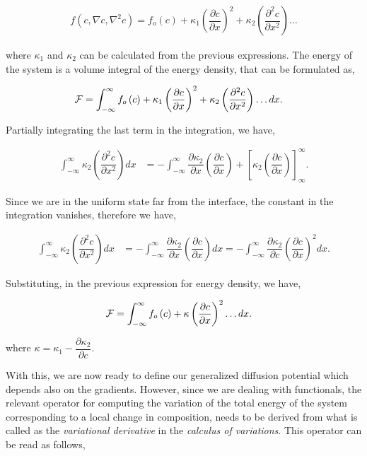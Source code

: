 \documentclass[english]{iambook}
\begin{document}
\begin{align}
 f\left(c, \nabla c, \nabla^{2}c\right) = f_o\left(c\right) + \kappa_1\left(\dfrac{\partial c}{\partial x}\right)^{2}
 + \kappa_2\left(\dfrac{\partial ^{2}c}{\partial x^{2}}\right)\ldots
\end{align}

where $\kappa_1$ and $\kappa_2$ can be calculated from the previous
expressions. The energy of the system is a volume integral of the energy
density, that can be formulated as, 

\begin{align}
 {\cal F} &= \int_{-\infty}^{\infty} f_o\left(c\right) +  \kappa_1\left(\dfrac{\partial c}{\partial x}\right)^{2}
 + \kappa_2\left(\dfrac{\partial ^{2}c}{\partial x^{2}}\right)\ldots dx.
 \label{energy_density}
\end{align}

Partially integrating the last term in the integration, we have,

\begin{align}
 \int_{-\infty}^{\infty}\kappa_2\left(\dfrac{\partial ^{2}c}{\partial x^{2}}\right)dx &=
 -\int_{-\infty}^{\infty}\dfrac{\partial \kappa_2}{\partial x}\left(\dfrac{\partial c}{\partial x}\right)
 +\left[\kappa_2\left(\dfrac{\partial c}{\partial x}\right)\right]_{\infty}^{\infty}.
\end{align}

Since we are in the uniform state far from the interface, the constant
in the integration vanishes, therefore we have,

\begin{align}
 \int_{-\infty}^{\infty}\kappa_2\left(\dfrac{\partial ^{2}c}{\partial x^{2}}\right)dx &=
 -\int_{-\infty}^{\infty}\dfrac{\partial \kappa_2}{\partial x}\left(\dfrac{\partial c}{\partial x}\right)dx=
 -\int_{-\infty}^{\infty}\dfrac{\partial \kappa_2}{\partial c}\left(\dfrac{\partial c}{\partial x}\right)^{2}dx.
\end{align}

Substituting, in the previous expression for energy density, we have, 

\begin{align}
 {\cal F} &= \int_{-\infty}^{\infty} f_o\left(c\right) +  \kappa\left(\dfrac{\partial c}{\partial x}\right)^{2}\ldots dx.
 \label{energy_functional}
\end{align}

where $\kappa = \kappa_1 -\dfrac{\partial \kappa_2}{\partial c}$.

With this, we are now ready to define our generalized diffusion potential 
which depends also on the gradients. However, since we are dealing with 
functionals, the relevant operator for computing the variation of the 
total energy of the system corresponding to a local change in composition, 
needs to be derived from what is called as the \textit{variational derivative} in 
the \textit{calculus of variations}. This operator can be read as follows,
\end{document}
